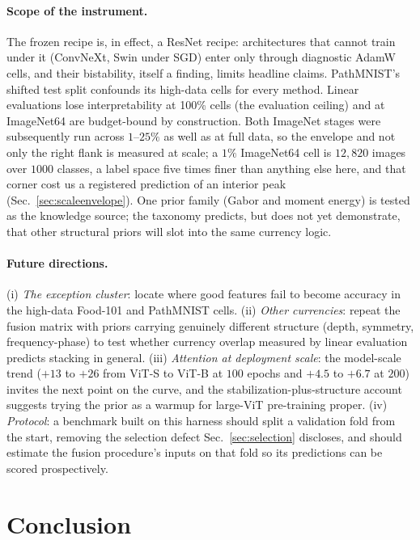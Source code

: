 \paragraph{Scope of the instrument.}  The frozen recipe is, in
effect, a ResNet recipe: architectures that cannot train under it (ConvNeXt,
Swin under SGD) enter only through diagnostic AdamW cells, and their
bistability, itself a finding, limits headline claims. PathMNIST's shifted test
split confounds its high-data cells for every method. Linear evaluations lose
interpretability at 100\% cells (the evaluation ceiling) and at ImageNet64 are
budget-bound by construction. Both ImageNet stages were subsequently run across
$1$--$25\%$ as well as at full data, so the envelope and not only the right
flank is measured at scale; a $1\%$ ImageNet64 cell is $12{,}820$ images over
$1000$ classes, a label space five times finer than anything else here, and
that corner cost us a registered prediction of an interior peak
(Sec.~\ref{sec:scaleenvelope}).
One prior family (Gabor and moment energy) is tested as the knowledge source;
the taxonomy predicts, but does not yet demonstrate, that other structural
priors will slot into the same currency logic.

\paragraph{Future directions.} (i) \emph{The exception cluster}: locate
where good features fail to become accuracy in the high-data Food-101 and
PathMNIST cells. (ii) \emph{Other currencies}:
repeat the fusion matrix with priors carrying genuinely different structure
(depth, symmetry, frequency-phase) to test whether currency overlap measured by
linear evaluation predicts stacking in general. (iii) \emph{Attention at
deployment scale}: the model-scale trend ($+13$ to $+26$ from ViT-S to ViT-B at
$100$ epochs and $+4.5$ to $+6.7$ at $200$) invites the next point on the curve, and the
stabilization-plus-structure account suggests trying the prior as a warmup for
large-ViT pre-training proper. (iv) \emph{Protocol}: a benchmark built on
this harness should split a validation fold from the start, removing the
selection defect Sec.~\ref{sec:selection} discloses, and should estimate
the fusion procedure's inputs on that fold so its predictions can be scored
prospectively.

\section{Conclusion}\label{sec:conclusion}

